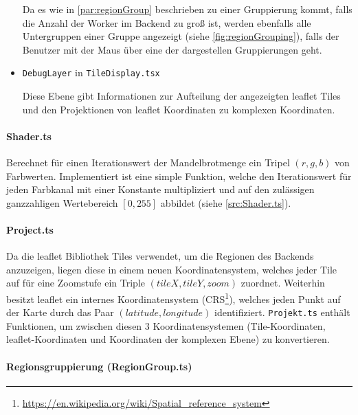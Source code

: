 \begin{itemize}
	      Da es wie in \autoref{par:regionGroup} beschrieben zu einer Gruppierung kommt, falls die Anzahl der Worker im Backend zu
	      groß ist, werden ebenfalls alle Untergruppen einer Gruppe angezeigt (siehe \autoref{fig:regionGrouping}), falls der Benutzer mit der Maus über eine der
	      dargestellen Gruppierungen geht.
	\item \verb|DebugLayer| in \verb|TileDisplay.tsx|

	      Diese Ebene gibt Informationen zur Aufteilung der angezeigten leaflet Tiles und den Projektionen von
	      leaflet Koordinaten zu komplexen Koordinaten.
\end{itemize}

\paragraph{Shader.ts}\label{par:shader}
Berechnet für einen Iterationswert der Mandelbrotmenge ein Tripel \( (r,g,b) \) von Farbwerten.
Implementiert ist eine simple Funktion, welche den Iterationswert für jeden Farbkanal mit einer Konstante multipliziert
und auf den zulässigen ganzzahligen Wertebereich \( [0,255] \) abbildet (siehe \autoref{src:Shader.ts}).

\begin{figure}[h!]
	
\end{figure}

\paragraph{Project.ts}
Da die leaflet Bibliothek Tiles verwendet, um die Regionen des Backends anzuzeigen, liegen diese in
einem neuen Koordinatensystem, welches jeder Tile auf für eine Zoomstufe ein Triple \( (tileX, tileY, zoom) \) zuordnet.
Weiterhin besitzt leaflet ein internes Koordinatensystem (CRS\footnote{\url{https://en.wikipedia.org/wiki/Spatial_reference_system}}),
welches jeden Punkt auf der Karte durch das Paar \( (latitude, longitude) \) identifiziert.
\verb|Projekt.ts| enthält Funktionen, um zwischen diesen 3 Koordinatensystemen
(Tile-Koordinaten, leaflet-Koordinaten und Koordinaten der komplexen Ebene) zu konvertieren.

\paragraph{Regionsgruppierung (RegionGroup.ts)}\label{par:regionGroup}

